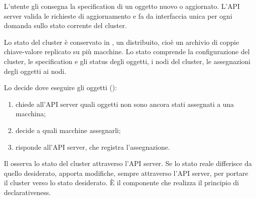 \begin{description}[leftmargin=0pt, style=unboxed]
  \item[API server.] L'utente gli consegna la specification di un oggetto nuovo o aggiornato. L'API server valida le
    richieste di aggiornamento e fa da interfaccia unica per ogni domanda sullo stato corrente del cluster.
  \item[etcd.] Lo stato del cluster è conservato in , un  distribuito, cioè un
    archivio di coppie chiave-valore replicato su più macchine. Lo stato comprende la configurazione del cluster, le
    specification e gli status degli oggetti, i nodi del cluster, le assegnazioni degli oggetti ai nodi.
  \item[Scheduler.] Lo  decide dove eseguire gli oggetti ():
    \begin{enumerate}
      \item chiede all'API server quali oggetti non sono ancora stati assegnati a una macchina;
      \item decide a quali macchine assegnarli;
      \item risponde all'API server, che registra l'assegnazione.
    \end{enumerate}
  \item[Controller-manager.] Il  osserva lo stato del cluster attraverso l'API server. Se
    lo stato reale differisce da quello desiderato, apporta modifiche, sempre attraverso l'API server, per portare il
    cluster verso lo stato desiderato. È il componente che realizza il principio di declarativeness.
\end{description}

